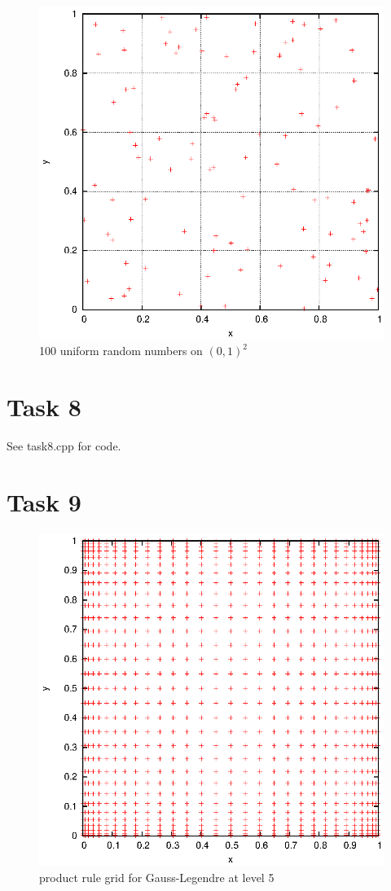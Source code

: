 \documentclass[]{article}
\begin{document}
\begin{figure}[!ht]
\centering
\includegraphics[width=.9\textwidth]{task7_uniform.eps}
\caption{100 uniform random numbers on $(0,1)^2$}
\label{fig:Task7b}
\end{figure}
\clearpage




\section*{Task 8}
See task8.cpp for code.

\section*{Task 9}
\begin{figure}[!ht]
\centering
\includegraphics[width=.9\textwidth]{task9_gauss}
\caption{product rule grid for Gauss-Legendre at level 5}
\label{fig:Task9a}
\end{figure}
\end{document}
